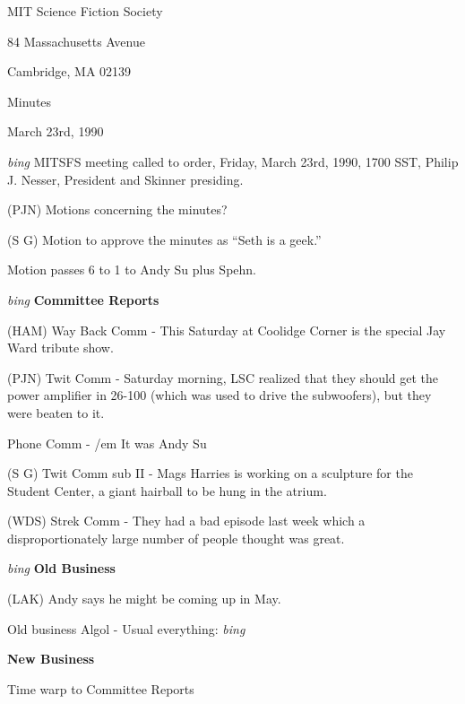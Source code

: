 \setlength{\topmargin}{-0.5in}
\setlength{\oddsidemargin}{0.0in}
\setlength{\evensidemargin}{0.0in}
\setlength{\textheight}{9in}
\setlength{\textwidth}{6.5in}



\begin{center}
MIT Science Fiction Society

84 Massachusetts Avenue

Cambridge, MA 02139

\vspace{0.2in}
Minutes

March 23rd, 1990

\end{center}
 
\vspace{0.15in}
{\em bing\/}  MITSFS meeting called to order, Friday, March 23rd, 1990,
1700 SST, Philip J. Nesser, President and Skinner presiding.

(PJN) Motions concerning the minutes?

(S G) Motion to approve the minutes as ``Seth is a geek.''

Motion passes 6 to 1 to Andy Su plus Spehn.

\vspace{0.15in}
{\em bing\/} {\bf Committee Reports}

(HAM) Way Back Comm - This Saturday at Coolidge Corner is the special
Jay Ward tribute show.

(PJN) Twit Comm - Saturday morning, LSC realized that they should get
the power amplifier in 26-100 (which was used to drive the
subwoofers), but they were beaten to it. 

Phone Comm - {/em It was Andy Su}

(S G) Twit Comm sub II - Mags Harries is working on a sculpture for the
Student Center, a giant hairball to be hung in the atrium.

(WDS) Strek Comm - They had a bad episode last week which a
disproportionately large number of people thought was great.

\vspace{0.15in}
{\em bing\/} {\bf Old Business}

(LAK) Andy says he might be coming up in May.

Old business Algol - Usual everything: {\em bing\/}

\vspace{0.15in}
{\bf New Business}

Time warp to Committee Reports

